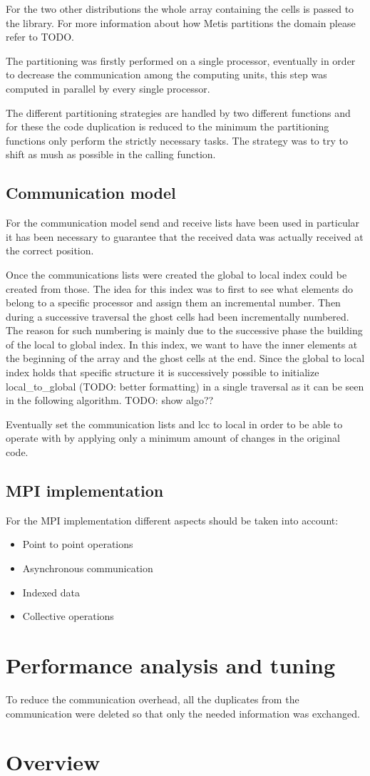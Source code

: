 \documentclass[12pt, a4paper]{article}
\begin{document}
  For the two other distributions the whole array containing the cells is passed
  to the library. For more information about how Metis partitions the domain
  please refer to TODO.

  The partitioning was firstly performed on a single processor, eventually in
  order to decrease the communication among the computing units, this step was
  computed in parallel by every single processor.

  The different partitioning strategies are handled by two different functions
  and for these the code duplication is reduced to the minimum the partitioning
  functions only perform the strictly necessary tasks. The strategy was to try
  to shift as mush as possible in the calling function.

  \subsection*{Communication model}
  For the communication model send and receive lists have been used in
  particular it has been necessary to guarantee that the received data was
  actually received at the correct position.

  Once the communications lists were created the global to local index could be
  created from those. The idea for this index was to first to see what elements
  do belong to a specific processor and assign them an incremental number. Then
  during a successive traversal the ghost cells had been incrementally numbered.
  The reason for such numbering is mainly due to the successive phase the
  building of the local to global index. In this index, we want to have the
  inner elements at the beginning of the array and the ghost cells at the end.
  Since the global to local index holds that specific structure it is
  successively possible to initialize local_to_global (TODO: better formatting)
  in a single traversal as it can be seen in the following algorithm.
  TODO: show algo??

  Eventually set the communication lists and lcc to local in order to be able to
  operate with by applying only a minimum amount of changes in the original
  code.

  \subsection*{MPI implementation}
  For the MPI implementation different aspects should be taken into account:
  \begin{itemize}
    \item Point to point operations
    \item Asynchronous communication
    \item Indexed data
    \item Collective operations
  \end{itemize}

\section{Performance analysis and tuning}
To reduce the communication overhead, all the duplicates from the communication
were deleted so that only the needed information was exchanged.

\section{Overview}
\end{document}

